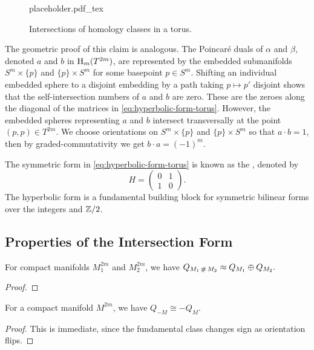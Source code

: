 \begin{figure}[ht]
	\centering
	{placeholder.pdf_tex}
	\caption{Intersections of homology classes in a torus.}\label{fig:geometric-intersection-torus} 
\end{figure}

The geometric proof of this claim is analogous. The Poincar\'e duals of $\alpha$ and $\beta$, denoted $a$ and $b$ in $\operatorname{H}_{m}(T^{2m})$, are represented
by the embedded submanifolds $S^m\times \{p\}$ and $\{p\}\times S^m$ for some basepoint $p\in S^m$. Shifting an individual embedded sphere to a disjoint embedding by a path taking $p\mapsto p'$ disjoint shows that the self-intersection numbers of $a$ and $b$ are zero. These are the zeroes along the diagonal of the matrices in \cref{eq:hyperbolic-form-torus}. However, the embedded spheres representing $a$ and $b$ intersect transversally at the point $(p,p)\in T^{2m}$. We choose orientations on $S^m\times \{p\}$ and $\{p\}\times S^m$ so that $a\cdot b=1$, then by graded-commutativity we get $b\cdot a=(-1)^m$.

\begin{remark}
	The symmetric form in \cref{eq:hyperbolic-form-torus} is known as the , denoted by
	\[
		H=\begin{pmatrix} 0 & 1\\ 1 & 0 \end{pmatrix}.
	\]
	The hyperbolic form is a fundamental building block for symmetric bilinear forms over the integers and $\mathbb{Z}/2$.
\end{remark}

\subsection{Properties of the Intersection Form}

\begin{proposition}\label{prop:connected-sum-intersection-form}
	For compact manifolds $M_1^{2m}$ and $M_2^{2m}$, we have
	$Q_{M_1\,\#\,M_2} \approx Q_{M_1}\oplus Q_{M_2}.$
\end{proposition}
\begin{proof}
\end{proof}

\begin{proposition}\label{prop:orientation-intersection-form}
	For a compact manifold $M^{2m}$, we have
	$Q_{-M} \cong -Q_{M}$.
\end{proposition}
\begin{proof}
	This is immediate, since the fundamental class changes sign as orientation flips.
\end{proof}

